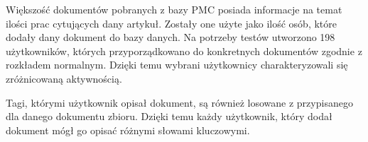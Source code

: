 Większość dokumentów pobranych z bazy PMC posiada informacje na temat ilości prac cytujących dany artykuł. Zostały one użyte jako ilość osób, które dodały dany dokument do bazy danych. Na potrzeby testów utworzono 198 użytkowników, których przyporządkowano do konkretnych dokumentów zgodnie z rozkładem normalnym. Dzięki temu wybrani użytkownicy charakteryzowali się zróżnicowaną aktywnością. 

Tagi, którymi użytkownik opisał dokument, są również losowane z przypisanego dla danego dokumentu zbioru. Dzięki temu każdy użytkownik, który dodał dokument mógł go opisać różnymi słowami kluczowymi.











